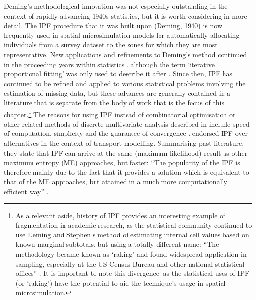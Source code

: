\documentclass[a4paper, 11pt, twoside]{Thesis}
\begin{document}
Deming's methodological innovation was not especially outstanding in the context of
rapidly advancing 1940s statistics, but it is worth considering in more detail. The
IPF procedure that it was built upon (Deming, 1940) 
is now frequently used in spatial microsimulation models
 for automatically allocating individuals from a survey
dataset to the zones for which they are most representative.
New applications and refinements to Deming's method continued in the
proceeding years within statistics
\citep{stephan1942iterative,Friedlander1961-ipf}, although the term `iterative
proportional fitting' was only used to describe it after
\citet{Fienberg1970}. Since then, IPF has continued to be refined and applied to
various statistical problems involving the estimation of missing data, but
these advances are generally contained in a literature that is separate from
the body of work that is the focus of this
chapter.\footnote{As
a relevant
aside, history of IPF provides an interesting example of fragmentation in
academic research, as the statistical community continued to use Deming and
Stephen's method of estimating internal cell values based on known marginal
subtotals,
but using a totally different name: ``The methodology became known as `raking'
and found widespread application in sampling, especially at the US Census Bureau
and other national statistical offices''  \citet{Fienberg2007}. It is important
to note this divergence, as the statistical uses of IPF (or `raking') have the
potential to aid the technique's usage in spatial microsimulation.
}
The reasons for using IPF instead of combinatorial optimisation or other related
methods of discrete multivariate analysis described
in \citet{bishop2007discrete} include 
speed of computation, simplicity and
the guarantee of convergence \citep{Deming1940, Mosteller1968,
Fienberg1970, Wong1992, Pritchard2012}.
\citet{Rich2012} endorsed IPF over alternatives in the context of transport modelling.
Summarising past literature, they state that IPF can arrive at the same
(maximum likelihood) result as other maximum entropy (ME) approaches,
but faster: ``The popularity of the IPF is therefore mainly due to the
fact that it provides a solution which is equivalent to that of the ME approaches,
but attained in a much more computationally efficient way'' \citep{Rich2012}.
\end{document}
